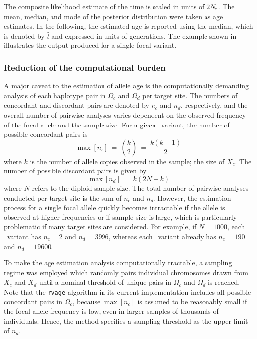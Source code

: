 %

%

The composite likelihood estimate of the time is scaled in units of ${2 N_{\!e}}$.
The mean, median, and mode of the posterior distribution were taken as age estimates.
In the following, the estimated age is reported using the median, which is denoted by $\hat{t}$ and expressed in units of generations.
The example shown in  illustrates the output produced for a single focal variant.


%
\subsubsection{Reduction of the computational burden}
%

A major caveat to the estimation of allele age is the computationally demanding analysis of each haplotype pair in $\Omega_c$ and $\Omega_d$ per target site.
The numbers of concordant and discordant pairs are denoted by $n_c$ and $n_d$, respectively, and the overall number of pairwise analyses varies dependent on the observed frequency of the focal allele and the sample size.
For a given \fk{}~variant, the number of possible concordant pairs is
\begin{equation}\label{eq:age_nc}
	\max[n_c] ~=~ {{k}\choose{2}} ~=~ \frac{k(k-1)}{2}
\end{equation}
where $k$ is the number of allele copies observed in the sample; \ie the size of $X_c$.
The number of possible discordant pairs is given by
\begin{equation}\label{eq:age_nd}
	\max[n_d] ~=~ k(2N-k)
\end{equation}
where $N$ refers to the diploid sample size.
The total number of pairwise analyses conducted per target site is the sum of $n_c$ and $n_d$.
However, the estimation process for a single focal allele quickly becomes intractable if the allele is observed at higher frequencies or if sample size is large, which is particularly problematic if many target sites are considered.
For example, if ${N=\num{1000}}$, each ~variant has ${n_c=2}$ and ${n_d=\num{3996}}$, whereas each ~variant already has ${n_c=\num{190}}$ and ${n_d=\num{19600}}$.

To make the age estimation analysis computationally tractable, a sampling regime was employed which randomly pairs individual chromosomes drawn from $X_c$ and $X_d$ until a nominal threshold of unique pairs in $\Omega_c$ and $\Omega_d$ is reached.
Note that the \texttt{rvage} algorithm in its current implementation includes all possible concordant pairs in $\Omega_c$, because ${\max[n_c]}$ is assumed to be reasonably small if the focal allele frequency is low, even in larger samples of thousands of individuals.
Hence, the method specifies a sampling threshold as the upper limit of $n_d$.


